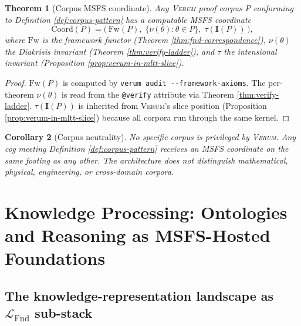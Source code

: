 \documentclass[11pt, a4paper]{article}
\newtheorem{theorem}{Theorem}[section]
\newtheorem{corollary}[theorem]{Corollary}
\theoremstyle{definition}
\theoremstyle{remark}
\newcommand{\LFnd}{\mathcal{L}_{\mathrm{Fnd}}}
\newcommand{\II}{\mathbf{I}}
\newcommand{\Verum}{\textsc{Verum}}
\begin{document}
\begin{theorem}[Corpus MSFS coordinate]
\label{thm:corpus-msfs-coordinate}
Any \Verum{} proof corpus $P$ conforming to Definition \ref{def:corpus-pattern} has a computable MSFS coordinate
\[
\mathrm{Coord}(P) = \bigl(\, \mathrm{Fw}(P),\; \{ \nu(\theta) : \theta \in P \},\; \tau(\II(P)) \,\bigr),
\]
where $\mathrm{Fw}$ is the framework functor (Theorem \ref{thm:fnd-correspondence}), $\nu(\theta)$ the Diakrisis invariant (Theorem \ref{thm:verify-ladder}), and $\tau$ the intensional invariant (Proposition \ref{prop:verum-in-mltt-slice}).
\end{theorem}

\begin{proof}
$\mathrm{Fw}(P)$ is computed by \verb|verum audit --framework-axioms|. The per-theorem $\nu(\theta)$ is read from the \texttt{@verify} attribute via Theorem \ref{thm:verify-ladder}. $\tau(\II(P))$ is inherited from \Verum{}'s slice position (Proposition \ref{prop:verum-in-mltt-slice}) because all corpora run through the same kernel.
\end{proof}

\begin{corollary}[Corpus neutrality]
\label{cor:corpus-neutrality}
No specific corpus is privileged by \Verum{}. Any cog meeting Definition \ref{def:corpus-pattern} receives an MSFS coordinate on the same footing as any other. The architecture does not distinguish mathematical, physical, engineering, or cross-domain corpora.
\end{corollary}

\section{Knowledge Processing: Ontologies and Reasoning as MSFS-Hosted Foundations}
\label{sec:kr}

\subsection{The knowledge-representation landscape as $\LFnd$ sub-stack}
\label{subsec:kr-landscape}
\end{document}
